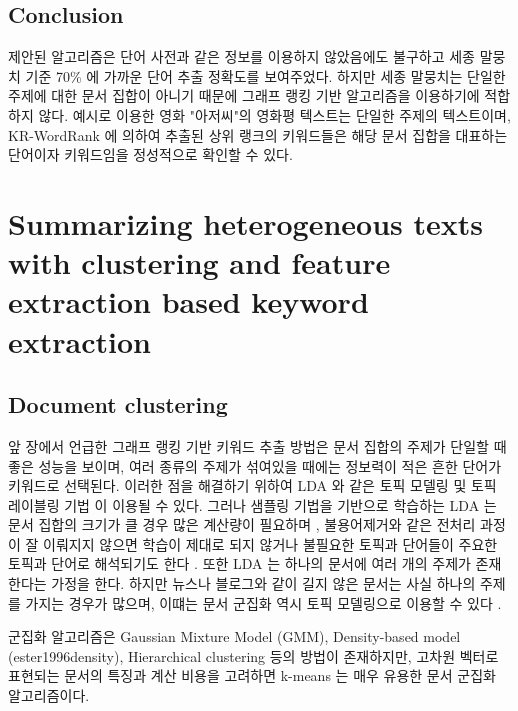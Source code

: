 \documentclass[11pt]{article}
\begin{document}
\subsection{Conclusion}

제안된 알고리즘은 단어 사전과 같은 정보를 이용하지 않았음에도 불구하고 세종 말뭉치 기준 70\% 에 가까운 단어 추출 정확도를 보여주었다.
하지만 세종 말뭉치는 단일한 주제에 대한 문서 집합이 아니기 때문에 그래프 랭킹 기반 알고리즘을 이용하기에 적합하지 않다.
예시로 이용한 영화 "아저씨"의 영화평 텍스트는 단일한 주제의 텍스트이며, KR-WordRank 에 의하여 추출된 상위 랭크의 키워드들은 해당 문서 집합을 대표하는 단어이자 키워드임을 정성적으로 확인할 수 있다.


\newpage
\section{Summarizing heterogeneous texts with clustering and feature extraction based keyword extraction}

\subsection{Document clustering}

앞 장에서 언급한 그래프 랭킹 기반 키워드 추출 방법은 문서 집합의 주제가 단일할 때 좋은 성능을 보이며, 여러 종류의 주제가 섞여있을 때에는 정보력이 적은 흔한 단어가 키워드로 선택된다.
이러한 점을 해결하기 위하여 LDA \citep{blei2003latent} 와 같은 토픽 모델링 및 토픽 레이블링 기법 \citep{sievert2014ldavis} 이 이용될 수 있다.
그러나 샘플링 기법을 기반으로 학습하는 LDA 는 문서 집합의 크기가 클 경우 많은 계산량이 필요하며 \citep{yuan2015lightlda}, 불용어제거와 같은 전처리 과정이 잘 이뤄지지 않으면 학습이 제대로 되지 않거나 불필요한 토픽과 단어들이 주요한 토픽과 단어로 해석되기도 한다 \citep{darling2011theoretical, newman2010evaluating}.
또한 LDA 는 하나의 문서에 여러 개의 주제가 존재한다는 가정을 한다.
하지만 뉴스나 블로그와 같이 길지 않은 문서는 사실 하나의 주제를 가지는 경우가 많으며, 이떄는 문서 군집화 역시 토픽 모델링으로 이용할 수 있다 \citep{dhillon2001concept, xu2003document}.

군집화 알고리즘은 Gaussian Mixture Model (GMM), Density-based model (ester1996density), Hierarchical clustering \citep{zhao2005hierarchical} 등의 방법이 존재하지만, 고차원 벡터로 표현되는 문서의 특징과 계산 비용을 고려하면 k-means \citep{lloyd1982least} 는 매우 유용한 문서 군집화 알고리즘이다.
\end{document}
